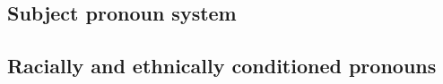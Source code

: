     \subsection{Subject pronoun system}
    \subsection{Racially and ethnically conditioned pronouns} %




      






